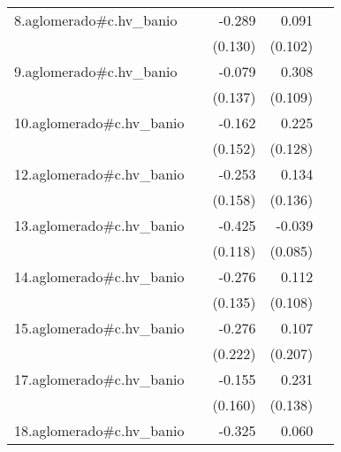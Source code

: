 {\begin{longtable}{l*{4}{D{.}{.}{-1}}}
\addlinespace
8.aglomerado#c.hv\_banio&                     &      -0.289\sym{*}  &       0.091         &                     \\
            &                     &     (0.130)         &     (0.102)         &                     \\
\addlinespace
9.aglomerado#c.hv\_banio&                     &      -0.079         &       0.308\sym{**} &                     \\
            &                     &     (0.137)         &     (0.109)         &                     \\
\addlinespace
10.aglomerado#c.hv\_banio&                     &      -0.162         &       0.225         &                     \\
            &                     &     (0.152)         &     (0.128)         &                     \\
\addlinespace
12.aglomerado#c.hv\_banio&                     &      -0.253         &       0.134         &                     \\
            &                     &     (0.158)         &     (0.136)         &                     \\
\addlinespace
13.aglomerado#c.hv\_banio&                     &      -0.425\sym{***}&      -0.039         &                     \\
            &                     &     (0.118)         &     (0.085)         &                     \\
\addlinespace
14.aglomerado#c.hv\_banio&                     &      -0.276\sym{*}  &       0.112         &                     \\
            &                     &     (0.135)         &     (0.108)         &                     \\
\addlinespace
15.aglomerado#c.hv\_banio&                     &      -0.276         &       0.107         &                     \\
            &                     &     (0.222)         &     (0.207)         &                     \\
\addlinespace
17.aglomerado#c.hv\_banio&                     &      -0.155         &       0.231         &                     \\
            &                     &     (0.160)         &     (0.138)         &                     \\
\addlinespace
18.aglomerado#c.hv\_banio&                     &      -0.325\sym{**} &       0.060         &                     \\

\end{longtable}}
